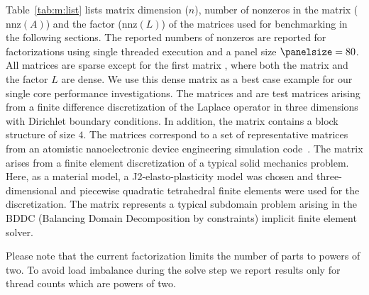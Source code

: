 Table~\ref{tab:m:list} lists matrix dimension ($n$), number of nonzeros in the
matrix ($\text{nnz}(A)$) and the factor (nnz$(L)$) of the matrices used for
benchmarking in the following sections.
The reported numbers of nonzeros 
are reported for factorizations using single threaded execution
and a panel size $\panelsize = 80$. 
All matrices are sparse except 
for the first matrix , where both the matrix and  
the factor $L$ are dense. 
We use this dense matrix as a best case example for our single core performance
investigations.
The matrices  and  are test matrices arising from a
finite difference discretization of the Laplace operator in three dimensions
with Dirichlet boundary conditions. 
In addition, the matrix  contains a block structure
of size $4$. 
The  matrices correspond to a set of representative matrices from 
an atomistic nanoelectronic device engineering simulation code~\cite{luisier2011atomistic}. 
The matrix  arises from a finite element discretization of a typical
solid mechanics problem. Here, as a material model, a J2-elasto-plasticity model
was chosen and three-dimensional and piecewise quadratic tetrahedral finite
elements were used for the discretization. The matrix  represents a
typical subdomain problem arising in the BDDC (Balancing Domain Decomposition by
constraints) implicit finite element solver.


Please note that the current factorization limits the number of parts to powers
of two.
To avoid load imbalance during the solve step we report results only for thread
counts which are powers of two.
%

